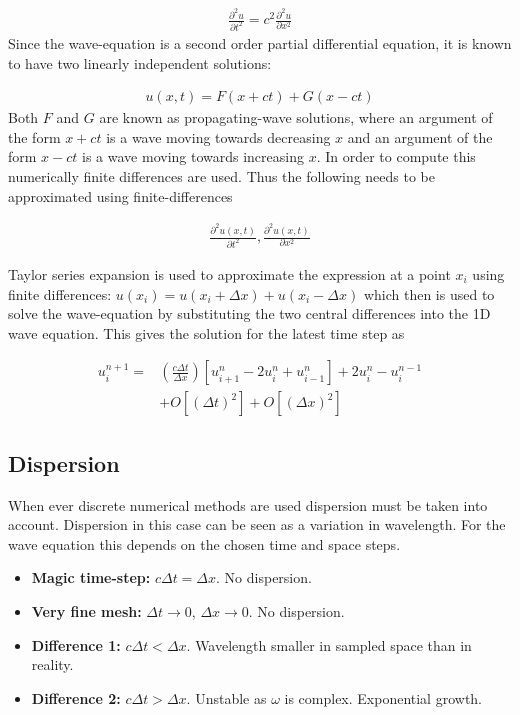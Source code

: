 \begin{align}
  \frac{\partial^2 u}{\partial t^2} = c^2 \frac{\partial^2 u}{\partial x^2}
\end{align}
Since the wave-equation is a second order partial differential equation, it is known to have two linearly independent solutions: 

\begin{align}
  u(x,t) = F(x+ct) + G(x-ct)
\end{align}
Both $F$ and $G$ are known as propagating-wave solutions, where an argument of the form $x+ct$ is a wave moving towards decreasing $x$ and an argument of the form $x-ct$ is a wave moving towards increasing $x$. In order to compute this numerically finite differences are used. Thus the following needs to be approximated using finite-differences 

\begin{align}
  \frac{\partial^2 u(x,t)}{\partial t^2},\frac{\partial^2 u(x,t)}{\partial x^2}
\end{align}

Taylor series expansion is used to approximate the expression at a point $x_i$ using finite differences: $u(x_i) = u(x_i+\Delta x) + u(x_i - \Delta x)$ which then is used to solve the wave-equation by substituting the two central differences into the 1D wave equation. This gives the solution for the latest time step as

\begin{align*}
  u_i^{n+1} =& \left( \frac{c\Delta t}{\Delta x} \right) \left[ u_{i+1}^n - 2u_i^n + u_{i-1}^n \right] + 2u_i^n -u_i^{n-1} \\
             &+ O[(\Delta t)^2] + O[(\Delta x)^2]
\end{align*}

\subsection{Dispersion}
When ever discrete numerical methods are used dispersion must be taken into account. Dispersion in this case can be seen as a variation in wavelength. For the wave equation this depends on the chosen time and space steps. 

\begin{itemize}
\item \textbf{Magic time-step:} $c\Delta t = \Delta x$. No dispersion.
\item \textbf{Very fine mesh:} $\Delta t \rightarrow 0$, $\Delta x \rightarrow 0$. No dispersion.
\item \textbf{Difference 1:} $c\Delta t < \Delta x$. Wavelength smaller in sampled space than in reality.
\item \textbf{Difference 2:} $c\Delta t > \Delta x$. Unstable as $\omega$ is complex. Exponential growth.
\end{itemize}

